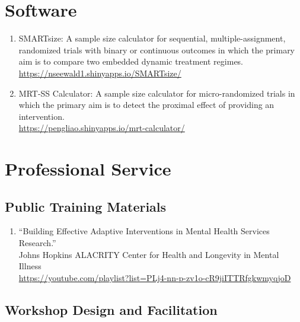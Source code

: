 \documentclass[letterpaper,11pt]{article} %
\begin{document}
\section*{Software}

	\begin{enumerate}
		\item SMARTsize: A sample size calculator for sequential, multiple-assignment, randomized trials with binary or continuous outcomes in which the primary aim is to compare two embedded dynamic treatment regimes. \\ \url{https://nseewald1.shinyapps.io/SMARTsize/}
		\item MRT-SS Calculator: A sample size calculator for micro-randomized trials in which the primary aim is to detect the proximal effect of providing an intervention.\\ \url{https://pengliao.shinyapps.io/mrt-calculator/}
	\end{enumerate}

\section*{Professional Service}
	
	\subsection*{Public Training Materials}
	
	\begin{enumerate}
		\item ``Building Effective Adaptive Interventions in Mental Health Services Research.'' \\
		Johns Hopkins ALACRITY Center for Health and Longevity in Mental Illness \\
		\url{https://youtube.com/playlist?list=PLj4-nn-p-zv1o-cR9jiITTRfgkwmyqjoD}
	\end{enumerate}

	\subsection*{Workshop Design and Facilitation}
		
\end{document}
